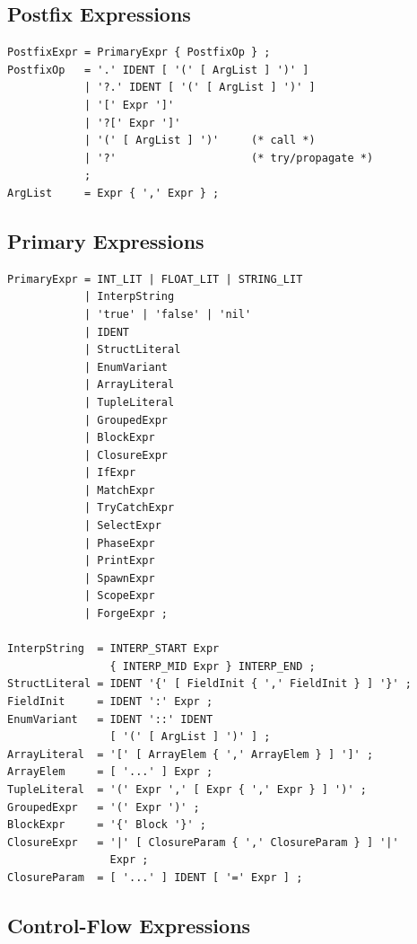\subsection{Postfix Expressions}

\begin{lstlisting}[style=ebnf]
PostfixExpr = PrimaryExpr { PostfixOp } ;
PostfixOp   = '.' IDENT [ '(' [ ArgList ] ')' ]
            | '?.' IDENT [ '(' [ ArgList ] ')' ]
            | '[' Expr ']'
            | '?[' Expr ']'
            | '(' [ ArgList ] ')'     (* call *)
            | '?'                     (* try/propagate *)
            ;
ArgList     = Expr { ',' Expr } ;
\end{lstlisting}

\subsection{Primary Expressions}

\begin{lstlisting}[style=ebnf]
PrimaryExpr = INT_LIT | FLOAT_LIT | STRING_LIT
            | InterpString
            | 'true' | 'false' | 'nil'
            | IDENT
            | StructLiteral
            | EnumVariant
            | ArrayLiteral
            | TupleLiteral
            | GroupedExpr
            | BlockExpr
            | ClosureExpr
            | IfExpr
            | MatchExpr
            | TryCatchExpr
            | SelectExpr
            | PhaseExpr
            | PrintExpr
            | SpawnExpr
            | ScopeExpr
            | ForgeExpr ;

InterpString  = INTERP_START Expr
                { INTERP_MID Expr } INTERP_END ;
StructLiteral = IDENT '{' [ FieldInit { ',' FieldInit } ] '}' ;
FieldInit     = IDENT ':' Expr ;
EnumVariant   = IDENT '::' IDENT
                [ '(' [ ArgList ] ')' ] ;
ArrayLiteral  = '[' [ ArrayElem { ',' ArrayElem } ] ']' ;
ArrayElem     = [ '...' ] Expr ;
TupleLiteral  = '(' Expr ',' [ Expr { ',' Expr } ] ')' ;
GroupedExpr   = '(' Expr ')' ;
BlockExpr     = '{' Block '}' ;
ClosureExpr   = '|' [ ClosureParam { ',' ClosureParam } ] '|'
                Expr ;
ClosureParam  = [ '...' ] IDENT [ '=' Expr ] ;
\end{lstlisting}

\subsection{Control-Flow Expressions}

